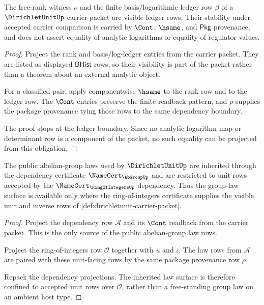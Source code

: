 \begin{theorem}
\label{thm:dirichletunit-free-rank-witness-ledger}
The free-rank witness $\nu$ and the finite basis/logarithmic ledger row $\beta$ of a $\DirichletUnitUp$ carrier packet are visible ledger rows. Their stability under accepted carrier comparison is carried by $\Cont$, $\hsame$, and $\mathsf{Pkg}$ provenance, and does not assert equality of analytic logarithms or equality of regulator values.
\end{theorem}
\begin{proof}
Project the rank and basis/log-ledger entries from the carrier packet. They are listed as displayed $\mathsf{BHist}$ rows, so their visibility is part of the packet rather than a theorem about an external analytic object.

For a classified pair, apply componentwise $\hsame$ to the rank row and to the ledger row. The $\Cont$ entries preserve the finite readback pattern, and $\rho$ supplies the package provenance tying those rows to the same dependency boundary.

The proof stops at the ledger boundary. Since no analytic logarithm map or determinant row is a component of the packet, no such equality can be projected from this obligation.
\end{proof}

\begin{theorem}
\label{thm:dirichletunit-abgroup-dependency-obligation}
The public abelian-group laws used by $\DirichletUnitUp$ are inherited through the dependency certificate $\NameCert_{\AbGroupUp}$ and are restricted to unit rows accepted by the $\NameCert_{\RingOfIntegersUp}$ dependency. Thus the group-law surface is available only where the ring-of-integers certificate supplies the visible unit and inverse rows of \autoref{def:dirichletunit-carrier-packet}.
\end{theorem}
\begin{proof}
Project the dependency row $\mathcal{A}$ and its $\Cont$ readback from the carrier packet. This is the only source of the public abelian-group law rows.

Project the ring-of-integers row $\mathcal{O}$ together with $u$ and $\iota$. The law rows from $\mathcal{A}$ are paired with these unit-facing rows by the same package provenance row $\rho$.

Repack the dependency projections. The inherited law surface is therefore confined to accepted unit rows over $\mathcal{O}$, rather than a free-standing group law on an ambient host type.
\end{proof}

